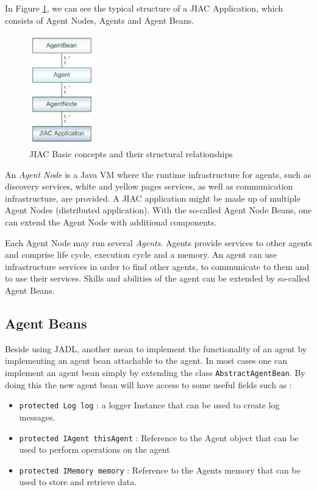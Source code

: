 In Figure \ref{fig:jiac_basic}, we can see the typical structure of a JIAC Application, which consists of Agent Nodes, Agents and Agent Beans.
\begin{figure}[h]
	\centering
		\includegraphics[width=0.25\textwidth]{images/jiac_basic.png}
		\caption{JIAC Basic concepts and their structural relationships \cite{JIACMAN10}}
	\label{fig:jiac_basic}
\end{figure}
An \textit{Agent Node} is a Java VM where the runtime infrastructure for agents, such as discovery services, white and yellow pages services, as well as communication infrastructure, are provided. A JIAC application might be made up of multiple Agent Nodes (distributed application). With the so-called Agent Node Beans, one can extend the Agent Node with additional components.

Each Agent Node may run several \textit{Agents}. Agents provide services to other agents
and comprise life cycle, execution cycle and a memory. An agent can use infrastructure
services in order to find other agents, to communicate to them and to use their services.
Skills and abilities of the agent can be extended by so-called Agent Beans.


\subsection{Agent Beans}
Beside using JADL, another mean to implement the functionality of an agent by implementing an agent bean attachable to the agent.
In most cases one can implement an agent bean simply by extending the class \texttt{AbstractAgentBean}. By doing this the new agent bean will have access to some useful fields such as :
\begin{itemize}
	\item \texttt{protected Log log} : a logger Instance that can be used to create log messages.
	\item \texttt{protected IAgent thisAgent} : Reference to the Agent object that can be used to perform operations on the agent
	\item \texttt{protected IMemory memory} : Reference to the Agents memory that can be used to store and retrieve data.
\end{itemize}

